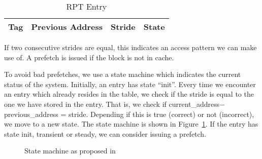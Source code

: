 \begin{table}
  \centering
  \begin{tabular}{ | c | c | c | c |}
    \hline
    Tag & Previous Address & Stride & State \\ \hline
  \end{tabular}
  \caption{RPT Entry}
  \label{table:entry}
\end{table}

If two consecutive strides are equal, this indicates an access pattern
we can make use of. A prefetch is issued if the block is not in
cache.

To avoid bad prefetches, we use a state machine which indicates the
current status of the system. Initially, an entry has state
``init''. Every time we encounter an entry which already resides in
the table, we check if the stride is equal to the one we have stored
in the entry. That is, we check if current\_address$ -
$previous\_address = stride. Depending if this is true (correct) or
not (incorrect), we move to a new state. The state machine is shown in
Figure~\ref{figure:statemachine}. If the entry has state init,
transient or steady, we can consider issuing a prefetch.


\begin{figure}[h]
\begin{center}
\caption{State machine as proposed in~\cite{chen_baer_1995}}
\label{figure:statemachine}
\end{center}
\end{figure}
